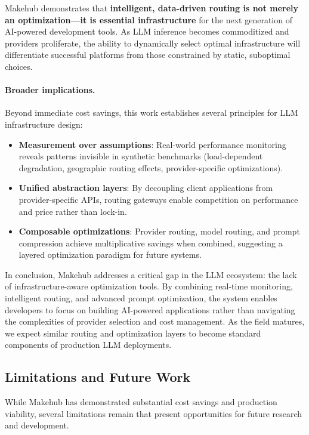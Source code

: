 \documentclass[english]{article}
\begin{document}
Makehub demonstrates that \textbf{intelligent, data-driven routing is not merely an optimization—it is essential infrastructure} for the next generation of AI-powered development tools. As LLM inference becomes commoditized and providers proliferate, the ability to dynamically select optimal infrastructure will differentiate successful platforms from those constrained by static, suboptimal choices.

\paragraph{Broader implications.}

Beyond immediate cost savings, this work establishes several principles for LLM infrastructure design:
\begin{itemize}
    \item \textbf{Measurement over assumptions}: Real-world performance monitoring reveals patterns invisible in synthetic benchmarks (load-dependent degradation, geographic routing effects, provider-specific optimizations).
    \item \textbf{Unified abstraction layers}: By decoupling client applications from provider-specific APIs, routing gateways enable competition on performance and price rather than lock-in.
    \item \textbf{Composable optimizations}: Provider routing, model routing, and prompt compression achieve multiplicative savings when combined, suggesting a layered optimization paradigm for future systems.
\end{itemize}

In conclusion, Makehub addresses a critical gap in the LLM ecosystem: the lack of infrastructure-aware optimization tools. By combining real-time monitoring, intelligent routing, and advanced prompt optimization, the system enables developers to focus on building AI-powered applications rather than navigating the complexities of provider selection and cost management. As the field matures, we expect similar routing and optimization layers to become standard components of production LLM deployments.

\subsection{Limitations and Future Work}

While Makehub has demonstrated substantial cost savings and production viability, several limitations remain that present opportunities for future research and development.
\end{document}
